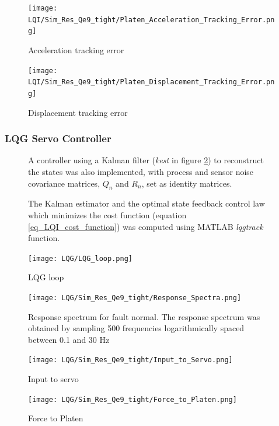 \documentclass[9pt]{extarticle}
\begin{document}
\begin{figure}[H]
\begin{minipage}{0.49\textwidth}
    \centering
    \texttt{[image: LQI/Sim\_Res\_Qe9\_tight/Platen\_Acceleration\_Tracking\_Error.png]}
    \caption{Acceleration tracking error}
    \label{fig_Platen_Acceleration_Tracking_Error_LQI_Qe9}
\end{minipage}
\hfill
\begin{minipage}{0.49\textwidth}
    \centering
    \texttt{[image: LQI/Sim\_Res\_Qe9\_tight/Platen\_Displacement\_Tracking\_Error.png]}
    \caption{Displacement tracking error}
    \label{fig_Platen_Displacement_Tracking_Error_LQI_Qe9}
\end{minipage}
\end{figure}

\subsubsection{LQG Servo Controller}\label{LQG Servo Controller}

\begin{figure}[H]
\begin{minipage}{0.49\textwidth}
A controller using a Kalman filter (\emph{kest} in figure \ref{fig_LQG_loop}) to reconstruct the states was also implemented, with process and sensor noise covariance matrices, $Q_n$ and $R_n$, set as identity matrices.

The Kalman estimator and the optimal state feedback control law which minimizes the cost function (equation \ref{eq_LQI_cost_function}) was computed using MATLAB \emph{lqgtrack} function.
\end{minipage}
\hfill
\begin{minipage}{0.49\textwidth}
    \centering
    \texttt{[image: LQG/LQG\_loop.png]}
    \caption{LQG loop}
    \label{fig_LQG_loop}
    \end{minipage}
\end{figure}

\begin{figure}[H]
    \centering
    \texttt{[image: LQG/Sim\_Res\_Qe9\_tight/Response\_Spectra.png]}
    \caption{Response spectrum for fault normal. The response spectrum was obtained by sampling 500 frequencies logarithmically spaced between 0.1 and 30 Hz}%
    \label{fig_resp_spectrum_LQG_Qe9}
\end{figure}


\begin{figure}[H]
\begin{minipage}{0.49\textwidth}
    \centering
    \texttt{[image: LQG/Sim\_Res\_Qe9\_tight/Input\_to\_Servo.png]}
    \caption{Input to servo}
    \label{fig_Input_to_Servo_LQG_Qe9}
\end{minipage}
\hfill
\begin{minipage}{0.49\textwidth}
    \centering
    \texttt{[image: LQG/Sim\_Res\_Qe9\_tight/Force\_to\_Platen.png]}
    \caption{Force to Platen}
    \label{fig_Force_LQG_Qe9} 
\end{minipage}
\end{figure}
   
\end{document}
